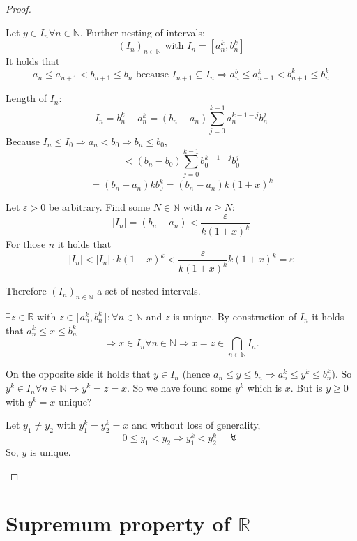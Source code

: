 \documentclass[a4paper,landscape,twocolumn]{article}
\theoremstyle{definition}
\newcommand\abs[1]{\left|#1\right|}
\begin{document}
\begin{proof}
\begin{description}
      Let $y \in I_n \forall n \in \mathbb N$.
      Further nesting of intervals:
      \[ (I_n)_{n \in \mathbb N} \text{ with } I_n = [a_n^k, b_n^k] \]
      It holds that
      \[
          a_n \leq a_{n+1} < b_{n+1} \leq b_n \text{ because } I_{n+1} \subseteq I_n
          \Rightarrow a_n^b \leq a_{n+1}^k < b_{n+1}^k \leq b_n^k
      \]

      Length of $I_n$:
      \[ I_n = b_n^k - a_n^k = (b_n - a_n) \sum_{j=0}^{k-1} a_n^{k-1-j} b_n^j \]
      Because $I_n \leq I_0 \Rightarrow a_n < b_0 \Rightarrow b_n \leq b_0$,
      \[ < (b_n - b_0) \sum_{j=0}^{k-1} b_0^{k-1-j} b_0^{j} \]
      \[ = (b_n - a_n) k b_0^k = (b_n - a_n) k (1 + x)^k \]

      Let $\varepsilon > 0$ be arbitrary. Find some $N \in \mathbb N$ with $n \geq N$:
      \[ \abs{I_n} = (b_n - a_n) < \frac{\varepsilon}{k (1 + x)^k} \]
      For those $n$ it holds that
      \[ \abs{I_n} < \abs{I_n} \cdot k (1 - x)^k < \frac{\varepsilon}{k (1 + x)^k} k (1 + x)^k = \varepsilon \]

      Therefore $(I_n)_{n \in \mathbb N}$ a set of nested intervals.

      $\exists z \in \mathbb R$ with $z \in \lfloor a_n^k, b_n^k\rfloor: \forall n \in \mathbb N$
      and $z$ is unique. By construction of $I_n$ it holds that $a_n^k \leq x \leq b_n^k$
      \[ \Rightarrow x \in I_n \forall n \in \mathbb N \Rightarrow x = z \in \bigcap_{n \in \mathbb N} I_n. \]

      On the opposite side it holds that $y \in I_n$ (hence $a_n \leq y \leq b_n \Rightarrow a_n^k \leq y^k \leq b_n^k$).
      So $y^k \in I_n \forall n \in \mathbb N \Rightarrow y^k = z = x$.
      So we have found some $y^k$ which is $x$. But is $y \geq 0$ with $y^k = x$ unique?

      Let $y_1 \neq y_2$ with $y_1^k = y_2^k = x$ and without loss of generality,
      \[ 0 \leq y_1 < y_2 \Rightarrow y_1^k < y_2^k \quad\lightning \]
      So, $y$ is unique.
  \end{description}
\end{proof}

\section{Supremum property of $\mathbb R$}
\end{document}
